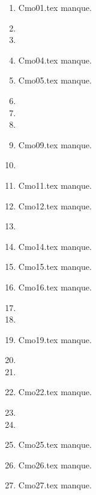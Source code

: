 \begin{enumerate}
  \item Cmo01.tex manque. 
  \item  
  \item  
  \item Cmo04.tex manque. 
  \item Cmo05.tex manque. 
  \item  
  \item  
  \item  
  \item Cmo09.tex manque. 
  \item  
  \item Cmo11.tex manque. 
  \item Cmo12.tex manque. 
  \item  
  \item Cmo14.tex manque. 
  \item Cmo15.tex manque. 
  \item Cmo16.tex manque. 
  \item  
  \item  
  \item Cmo19.tex manque. 
  \item  
  \item  
  \item Cmo22.tex manque. 
  \item  
  \item  
  \item Cmo25.tex manque. 
  \item Cmo26.tex manque. 
  \item Cmo27.tex manque. 
\end{enumerate} 
